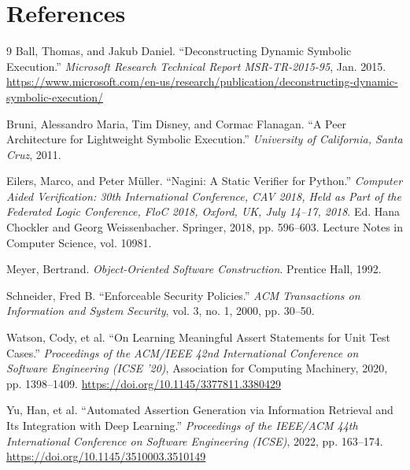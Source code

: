 \documentclass[8pt]{extarticle}
\begin{document}


\section*{References}

\renewcommand{\refname}{}
\vspace{-2em}
\begin{thebibliography}{9}
 Ball, Thomas, and Jakub Daniel. ``Deconstructing Dynamic Symbolic Execution.'' \textit{Microsoft Research Technical Report MSR-TR-2015-95}, Jan. 2015. \url{https://www.microsoft.com/en-us/research/publication/deconstructing-dynamic-symbolic-execution/}

 Bruni, Alessandro Maria, Tim Disney, and Cormac Flanagan. ``A Peer Architecture for Lightweight Symbolic Execution.'' \textit{University of California, Santa Cruz}, 2011.

 Eilers, Marco, and Peter Müller. ``Nagini: A Static Verifier for Python.'' \textit{Computer Aided Verification: 30th International Conference, CAV 2018, Held as Part of the Federated Logic Conference, FloC 2018, Oxford, UK, July 14--17, 2018}. Ed. Hana Chockler and Georg Weissenbacher. Springer, 2018, pp. 596--603. Lecture Notes in Computer Science, vol. 10981.

 Meyer, Bertrand. \textit{Object-Oriented Software Construction}. Prentice Hall, 1992.

 Schneider, Fred B. ``Enforceable Security Policies.'' \textit{ACM Transactions on Information and System Security}, vol. 3, no. 1, 2000, pp. 30--50.

 Watson, Cody, et al. ``On Learning Meaningful Assert Statements for Unit Test Cases.'' \textit{Proceedings of the ACM/IEEE 42nd International Conference on Software Engineering (ICSE '20)}, Association for Computing Machinery, 2020, pp. 1398--1409. \url{https://doi.org/10.1145/3377811.3380429}

 Yu, Han, et al. ``Automated Assertion Generation via Information Retrieval and Its Integration with Deep Learning.'' \textit{Proceedings of the IEEE/ACM 44th International Conference on Software Engineering (ICSE)}, 2022, pp. 163--174. \url{https://doi.org/10.1145/3510003.3510149}


\end{thebibliography}
\end{document}
